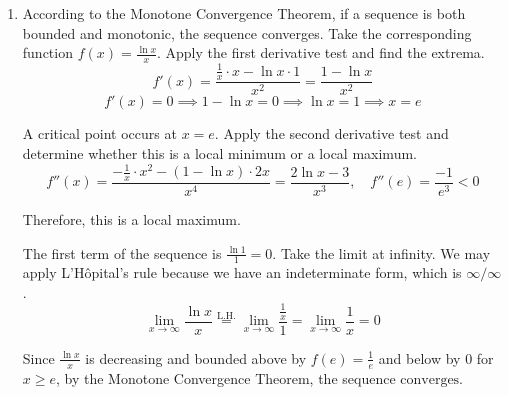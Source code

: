 \documentclass[a4paper, 12pt]{article}
\begin{document}
\begin{enumerate}[leftmargin=*,label=\textbf{\arabic*.}]
The integral diverges to negative infinity.

\item According to the Monotone Convergence Theorem, if a sequence is both bounded and monotonic, the sequence converges. Take the corresponding function $f(x)=\frac{\ln x}x$. Apply the first derivative test and find the extrema.
\[f'(x)=\frac{\frac1x\cdot x-\ln x\cdot1}{x^2}=\frac{1-\ln x}{x^2}\]
\[f'(x)=0\implies 1-\ln x=0\implies \ln x=1\implies x= e\]

A critical point occurs at $x= e$. Apply the second derivative test and determine whether this is a local minimum or a local maximum.
\[f''(x)=\frac{-\frac1x\cdot x^2-(1-\ln x)\cdot 2x}{x^4}=\frac{2\ln x-3}{x^3},\quad f''( e)=\frac{-1}{ e^3}<0\]

Therefore, this is a local maximum.

The first term of the sequence is $\frac{\ln 1}1=0$. Take the limit at infinity. We may apply L'Hôpital's rule because we have an indeterminate form, which is $\infty/\infty$.
\[\lim_{x\to\infty}\frac{\ln x}{x}\overset{\text{L.H.}}{=}\lim_{x\to\infty}\frac{\frac1x}1=\lim_{x\to\infty}\frac1x=0\]

Since $\frac{\ln x}x$ is decreasing and bounded above by $f( e)=\frac1{ e}$ and below by $0$ for $x\geq e$, by the Monotone Convergence Theorem, the sequence $\boxed{\text{converges}}$.
\end{enumerate}
\end{document}
